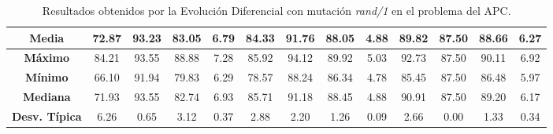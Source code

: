 \documentclass[11pt,a4paper]{article}
\begin{document}
\begin{table}[H]
{\begin{tabular}{c|c|c|c|c|c|c|c|c|c|c|c|c|}
\multicolumn{1}{|c|}{\textbf{Media}}        & 72.87                      & 93.23                   & 83.05                  & 6.79       & 84.33                      & 91.76                   & 88.05                  & 4.88       & 89.82                      & 87.50                   & 88.66                  & 6.27       \\ \hline
\multicolumn{1}{|c|}{\textbf{Máximo}}       & 84.21                      & 93.55                   & 88.88                  & 7.28       & 85.92                      & 94.12                   & 89.92                  & 5.03       & 92.73                      & 87.50                   & 90.11                  & 6.92       \\ \hline
\multicolumn{1}{|c|}{\textbf{Mínimo}}       & 66.10                      & 91.94                   & 79.83                  & 6.29       & 78.57                      & 88.24                   & 86.34                  & 4.78       & 85.45                      & 87.50                   & 86.48                  & 5.97       \\ \hline
\multicolumn{1}{|c|}{\textbf{Mediana}}      & 71.93                      & 93.55                   & 82.74                  & 6.93       & 85.71                      & 91.18                   & 88.45                  & 4.88       & 90.91                      & 87.50                   & 89.20                  & 6.17       \\ \hline
\multicolumn{1}{|c|}{\textbf{Desv. Típica}} & 6.26                       & 0.65                    & 3.12                   & 0.37       & 2.88                       & 2.20                    & 1.26                   & 0.09       & 2.66                       & 0.00                    & 1.33                   & 0.34       \\ \hline
\end{tabular}
}%
\caption{Resultados obtenidos por la Evolución Diferencial con mutación \textit{rand/1} en el problema del APC.}
\end{table}
\end{document}
